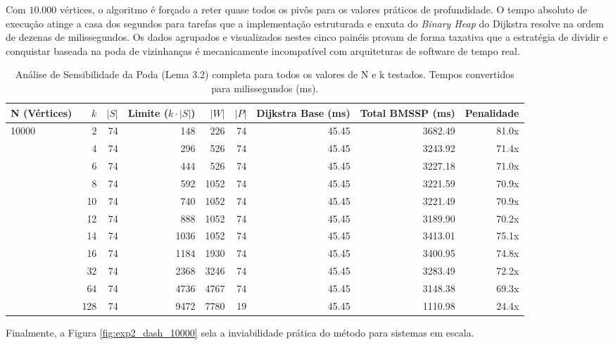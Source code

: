 \documentclass[10pt,a4paper]{article}
\begin{document}
Com $10.000$ vértices, o algoritmo é forçado a reter quase todos os pivôs para os valores práticos de profundidade. O tempo absoluto de execução atinge a casa dos segundos para tarefas que a implementação estruturada e enxuta do \textit{Binary Heap} do Dijkstra resolve na ordem de dezenas de milissegundos. Os dados agrupados e visualizados nestes cinco painéis provam de forma taxativa que a estratégia de dividir e conquistar baseada na poda de vizinhanças é mecanicamente incompatível com arquiteturas de software de tempo real.


\begin{table}[H]
\centering
\caption{Análise de Sensibilidade da Poda (Lema 3.2) completa para todos os valores de N e k testados. Tempos convertidos para milissegundos (ms).}
\label{tab:exp2_sensitivity_principal}
\footnotesize
\begin{tabular}{@{}lrrrrrrrr@{}}
\toprule
\textbf{N (Vértices)} & \textbf{$k$} & \textbf{$|S|$} & \textbf{Limite ($k \cdot |S|$)} & \textbf{$|W|$} & \textbf{$|P|$} & \textbf{Dijkstra Base (ms)} & \textbf{Total BMSSP (ms)} & \textbf{Penalidade} \\ \midrule

\multirow{11}{*}{10000}
 & 2   & 74 & 148  & 226  & 74 & 45.45 & 3682.49 & 81.0x \\
 & 4   & 74 & 296  & 526  & 74 & 45.45 & 3243.92 & 71.4x \\
 & 6   & 74 & 444  & 526  & 74 & 45.45 & 3227.18 & 71.0x \\
 & 8   & 74 & 592  & 1052 & 74 & 45.45 & 3221.59 & 70.9x \\
 & 10  & 74 & 740  & 1052 & 74 & 45.45 & 3221.49 & 70.9x \\
 & 12  & 74 & 888  & 1052 & 74 & 45.45 & 3189.90 & 70.2x \\
 & 14  & 74 & 1036 & 1052 & 74 & 45.45 & 3413.01 & 75.1x \\
 & 16  & 74 & 1184 & 1930 & 74 & 45.45 & 3400.95 & 74.8x \\
 & 32  & 74 & 2368 & 3246 & 74 & 45.45 & 3283.49 & 72.2x \\
 & 64  & 74 & 4736 & 4767 & 74 & 45.45 & 3148.38 & 69.3x \\
 & 128 & 74 & 9472 & 7780 & 19 & 45.45 & 1110.98 & 24.4x \\ \bottomrule
\end{tabular}
\end{table}

Finalmente, a Figura \ref{fig:exp2_dash_10000} sela a inviabilidade prática do método para sistemas em escala.
\end{document}
